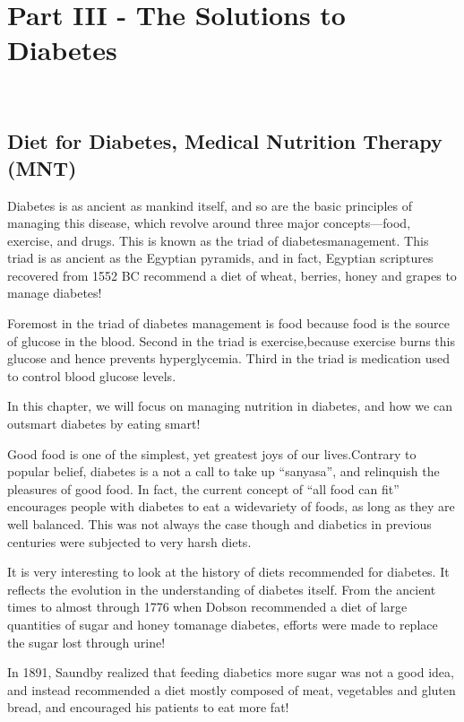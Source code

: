 
\part{\textbf{Part III - The Solutions to Diabetes}}

\newpage
~\phantom{a}
\thispagestyle{empty}
\newpage

\chapter{Diet for Diabetes, Medical Nutrition Therapy (MNT)}\label{chap22}

Diabetes is as ancient as mankind itself, and so are the basic principles of managing this disease, which revolve around three major concepts—food, exercise, and drugs. This is known as the triad of diabetes\break management. This triad is as ancient as the Egyptian pyramids, and in fact, Egyptian scriptures recovered from 1552 BC recommend a diet of wheat, berries, honey and grapes to manage diabetes!

Foremost in the triad of diabetes management is food because food is the source of glucose in the blood. Second in the triad is exercise,\break because exercise burns this glucose and hence prevents hyperglycemia. Third in the triad is medication used to control blood glucose levels.

In this chapter, we will focus on managing nutrition in diabetes, and how we can outsmart diabetes by eating smart!

Good food is one of the simplest, yet greatest joys of our lives.\break Contrary to popular belief, diabetes is a not a call to take up “sanyasa”, and relinquish the pleasures of good food. In fact, the current concept of “all food can fit” encourages people with diabetes to eat a wide\break variety of foods, as long as they are well balanced. This was not always the case though and diabetics in previous centuries were subjected to very harsh diets.


It is very interesting to look at the history of diets recommended for diabetes. It reflects the evolution in the understanding of diabetes itself. From the ancient times to almost through 1776 when Dobson recommended a diet of large quantities of sugar and honey to\break manage diabetes, efforts were made to replace the sugar lost through urine!

In 1891, Saundby realized that feeding diabetics more sugar was not a good idea, and instead recommended a diet mostly composed of meat, vegetables and gluten bread, and encouraged his patients to eat more fat!

